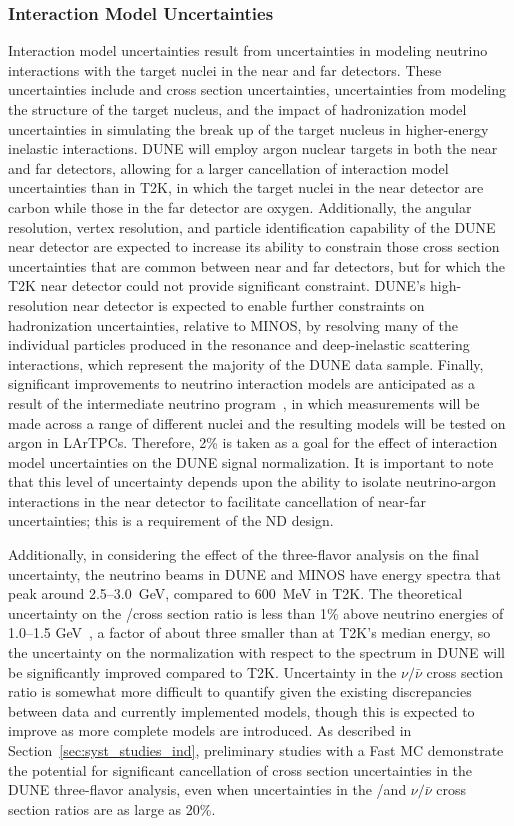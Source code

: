 \subsubsection{Interaction Model Uncertainties}
\label{sec:syst_just_sim}
Interaction model uncertainties result from uncertainties in modeling neutrino interactions with the target
nuclei in the near and far detectors. These uncertainties include \nue and \numu cross section uncertainties,
uncertainties from modeling the structure of the target nucleus, and the impact of
hadronization model uncertainties in simulating the break up of the target nucleus in higher-energy inelastic
interactions. DUNE will employ argon nuclear targets in both the near and far detectors, allowing for a larger
cancellation of interaction model uncertainties than in T2K, in which the target nuclei in the near detector are
carbon while those in the far detector are oxygen. Additionally, the angular resolution, vertex resolution,
and particle identification capability of the DUNE near detector are expected to increase its ability to
constrain those cross section uncertainties that are common between near and far detectors, but for which
the T2K near detector could not provide significant constraint. DUNE's high-resolution near
detector is expected to enable further constraints on hadronization uncertainties, relative to MINOS, by
resolving many of the individual particles produced in the resonance and deep-inelastic scattering interactions,
which represent the majority of the DUNE data sample. Finally, significant improvements to neutrino interaction
models are anticipated as a result of the intermediate neutrino program~\cite{Adams:2015ogl},
in which measurements will be made
across a range of different nuclei and the resulting models will be tested on argon in LArTPCs.
Therefore, 2\% is taken as a goal for the effect of
interaction model uncertainties on the DUNE \nue signal normalization. It is important to note that this level of
uncertainty depends upon the ability to isolate neutrino-argon interactions in the near detector to facilitate
cancellation of near-far uncertainties; this is a requirement of the ND design.

Additionally, in considering the effect of the three-flavor analysis on the final uncertainty,
the neutrino beams in DUNE and MINOS have energy
spectra that peak around 2.5--3.0~GeV, compared to 600~MeV in T2K. 
The theoretical uncertainty on the \nue/\numu cross section ratio is
less than 1\% above neutrino energies of 1.0--1.5 GeV~\cite{Day-McFarland:2012},
a factor of about three smaller than at T2K's median energy,
so the uncertainty on the \nue normalization with respect to the \numu spectrum in DUNE will be
significantly improved compared to T2K. Uncertainty in the $\nu/\bar{\nu}$ cross section ratio is
somewhat more difficult to quantify given the existing discrepancies between data and currently
implemented models, though this is expected to improve as more complete models are introduced.
As described in Section~\ref{sec:syst_studies_ind}, preliminary studies with a
Fast MC demonstrate the potential for significant cancellation of cross section uncertainties
in the DUNE three-flavor
analysis, even when uncertainties in the \nue/\numu and $\nu/\bar\nu$ cross section ratios
are as large as 20\%.

